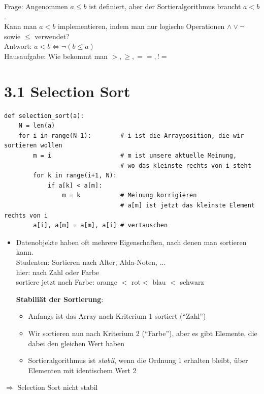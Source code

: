 \documentclass[11pt, fleqn]{scrreprt}
\begin{document}
            Frage: Angenommen $a \leq b$ ist definiert, aber der Sortieralgorithmus braucht $a < b$. \\
            Kann man $a < b$ implementieren, indem man nur logische Operationen $\land \lor \lnot$ sowie $\leq$ verwendet? \\

            Antwort: $a < b \Leftrightarrow \lnot(b \leq a)$ \\

            Hausaufgabe: Wie bekommt man $>, \geq, ==, !=$ \\

            \section*{3.1 Selection Sort}

            \begin{verbatim}
def selection_sort(a):
    N = len(a)
    for i in range(N-1):        # i ist die Arrayposition, die wir sortieren wollen
        m = i                   # m ist unsere aktuelle Meinung,
                                # wo das kleinste rechts von i steht
        for k in range(i+1, N):
            if a[k] < a[m]:
                m = k           # Meinung korrigieren
                                # a[m] ist jetzt das kleinste Element rechts von i
        a[i], a[m] = a[m], a[i] # vertauschen
            \end{verbatim}
            \begin{itemize}
                \item Datenobjekte haben oft mehrere Eigenschaften, nach denen man sortieren kann. \\
                Studenten: Sortieren nach Alter, Alda-Noten, ... \\
                hier: nach Zahl oder Farbe\\
                sortiere jetzt nach Farbe: orange $<$ rot$ <$ blau $<$ schwarz

                \textbf{Stabiliät der Sortierung}:
                \begin{itemize}
                    \item Anfangs ist das Array nach Kriterium 1 sortiert (``Zahl'')
                    \item Wir sortieren nun nach Kriterium 2 (``Farbe''), aber es gibt Elemente, die dabei den gleichen Wert haben
                    \item Sortieralgorithmus ist \emph{stabil}, wenn die Ordnung 1 erhalten bleibt, über Elementen mit identischem Wert 2
                \end{itemize}
            \end{itemize}
            $\Rightarrow$ Selection Sort nicht stabil \\
\end{document}
